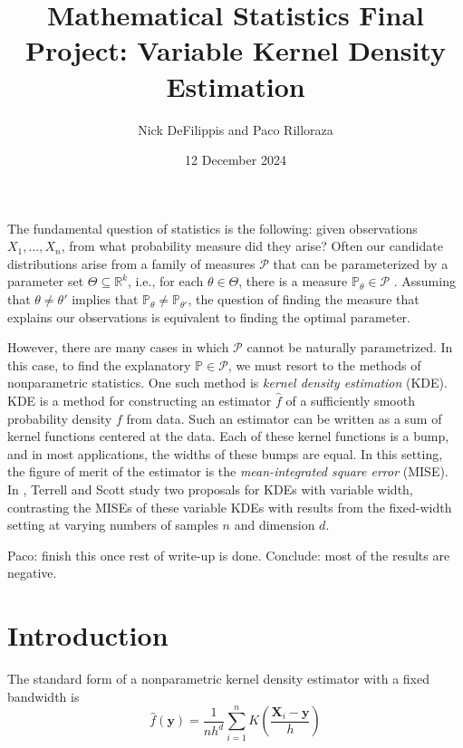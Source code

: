 \documentclass{article}
\title{Mathematical Statistics Final Project: Variable Kernel Density Estimation}
\author{Nick DeFilippis and Paco Rilloraza}
\date{12 December 2024}
\newcommand{\R}{\mathbb{R}}
\begin{document}
\maketitle

The fundamental question of statistics is the following: given observations $X_1, \dots, X_n$, from what probability measure did they arise? Often our candidate distributions arise from a family of measures $\mathcal{P}$ that can be parameterized by a parameter set $\Theta \subseteq \R^k$, i.e., for each $\theta \in \Theta$, there is a measure $\mathbb{P}_\theta \in \mathcal{P}$ \cite{jnw}. Assuming that $\theta \neq \theta'$ implies that $\mathbb{P}_\theta \neq \mathbb{P}_{\theta'}$, the question of finding the measure that explains our observations is equivalent to finding the optimal parameter. 

However, there are many cases in which $\mathcal{P}$ cannot be naturally parametrized. In this case, to find the explanatory $\mathbb{P} \in \mathcal{P}$, we must resort to the methods of nonparametric statistics. One such method is \textit{kernel density estimation} (KDE). KDE is a method for constructing an estimator $\hat{f}$ of a sufficiently smooth probability density $f$ from data. Such an estimator can be written as a sum of kernel functions centered at the data. Each of these kernel functions is a bump, and in most applications, the widths of these bumps are equal. In this setting, the figure of merit of the estimator is the \textit{mean-integrated square error} (MISE). In \cite{vkde}, Terrell and Scott study two proposals for KDEs with variable width, contrasting the MISEs of these variable KDEs with results from the fixed-width setting at varying numbers of samples $n$ and dimension $d$. 

{\color{blue} Paco: finish this once rest of write-up is done. Conclude: most of the results are negative.}

\section{Introduction}

The standard form of a nonparametric kernel density estimator with a fixed bandwidth is
\begin{equation}\label{eq:fixed-width-kde}
    \hat{f}(\mathbf{y}) = \frac{1}{nh^d}\sum_{i=1}^nK\left(\frac{\mathbf{X}_i-\mathbf{y}}{h}\right)
\end{equation}
\end{document}
